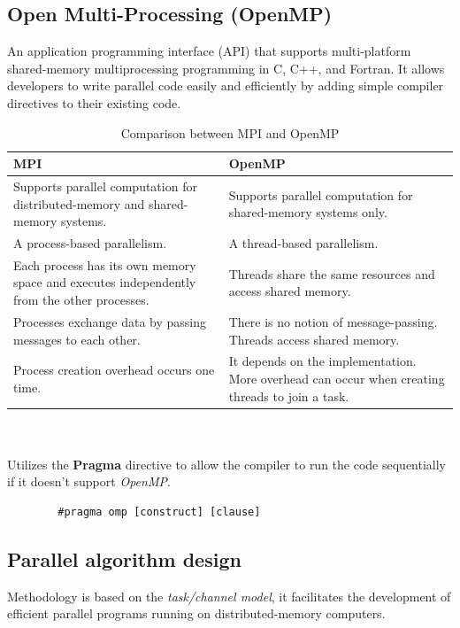 \documentclass[11pt,a4paper]{article}
\begin{document}
	\subsection{Open Multi-Processing (OpenMP)}
	An application programming interface (API) that supports multi-platform shared-memory multiprocessing programming in C, C++, and Fortran. 
	It allows developers to write parallel code easily and efficiently by adding simple compiler directives to their existing code.
	\begin{table}[h]
		\centering
		\begin{tabular}{|p{}|p{}|}
			\hline
			\textbf{MPI} & \textbf{OpenMP} \\ \hline
			Supports parallel computation for distributed-memory and shared-memory systems. & Supports parallel computation for shared-memory systems only. \\ \hline
			A process-based parallelism. & A thread-based parallelism. \\ \hline
			Each process has its own memory space and executes independently from the other processes. & Threads share the same resources and access shared memory. \\ \hline
			Processes exchange data by passing messages to each other. & There is no notion of message-passing. Threads access shared memory. \\ \hline
			Process creation overhead occurs one time. & It depends on the implementation. More overhead can occur when creating threads to join a task. \\ \hline
		\end{tabular}
		\caption{Comparison between MPI and OpenMP}
	\end{table} 
	\\\\Utilizes the \textbf{Pragma} directive to allow the compiler to run the code sequentially if it doesn't support \textit{OpenMP}.
	\begin{lstlisting}
		#pragma omp [construct] [clause]
	\end{lstlisting}

	
	\label{sec:background}
	\subsection{Parallel algorithm design}
	Methodology is based on the \textit{task/channel model}, it facilitates the development of efficient parallel programs running on distributed-memory computers.
	
\end{document}
